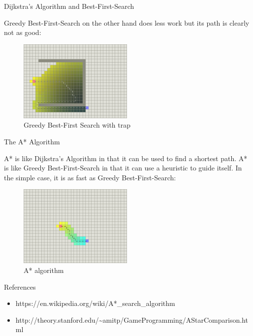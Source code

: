 \documentclass[ignorenonframetext,]{beamer}
\providecommand{\tightlist}{%
  \setlength{\itemsep}{0pt}\setlength{\parskip}{0pt}}
\begin{document}
\begin{frame}{Dijkstra's Algorithm and Best-First-Search}
\protect\hypertarget{dijkstras-algorithm-and-best-first-search-1}{}

Greedy Best-First-Search on the other hand does less work but its path
is clearly not as good:

\begin{figure}
\centering
\includegraphics[width=\textwidth,height=1.5625in]{best-first-search-trap.png}
\caption{Greedy Best-First Search with trap}
\end{figure}

\end{frame}

\begin{frame}{The A* Algorithm}
\protect\hypertarget{the-a-algorithm}{}

A* is like Dijkstra's Algorithm in that it can be used to find a
shortest path. A* is like Greedy Best-First-Search in that it can use a
heuristic to guide itself. In the simple case, it is as fast as Greedy
Best-First-Search:

\begin{figure}
\centering
\includegraphics[width=\textwidth,height=1.5625in]{a-star.png}
\caption{A* algorithm}
\end{figure}

\end{frame}

\begin{frame}{References}
\protect\hypertarget{references}{}

\begin{itemize}
\tightlist
\item
  https://en.wikipedia.org/wiki/A*\_search\_algorithm
\item
  http://theory.stanford.edu/\textasciitilde{}amitp/GameProgramming/AStarComparison.html
\end{itemize}

\end{frame}
\end{document}
